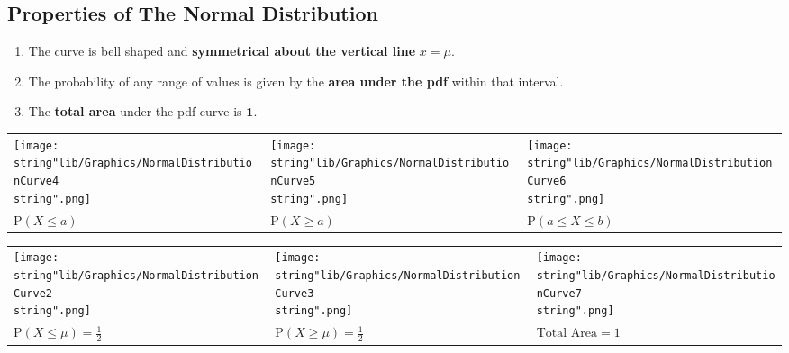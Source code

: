 \documentclass[11pt,a4paper]{book}
\begin{document}
\newpage

\subsection{Properties of The Normal Distribution}

\begin{enumerate}

\item  The curve is bell shaped and \textbf{symmetrical about the
vertical line} $x=\mu$.

\item  The probability of any range of values is given by the \textbf{area
under the pdf} within that interval.

\item  The \textbf{total area} under the pdf curve is $\textbf{1}$.

\end{enumerate}
\begin{center}
\begin{tabular}{>{\centering}p{5cm}>{\centering}p{5cm}>{\centering}p{5cm}}
\centering{}\texttt{[image: \\string"lib/Graphics/NormalDistributionCurve4\\string".png]} & \centering{}\texttt{[image: \\string"lib/Graphics/NormalDistributionCurve5\\string".png]} & \centering{}\texttt{[image: \\string"lib/Graphics/NormalDistributionCurve6\\string".png]}\tabularnewline
$\text{P}\left(X\leq a\right)$ & $\text{P}\left(X\geq a\right)$ & $\text{P}\left(a\leq X\leq b\right)$\tabularnewline
\end{tabular}
\par\end{center}

\begin{center}
\begin{tabular}{>{\centering}p{5cm}>{\centering}p{5cm}>{\centering}p{5cm}}
\centering{}\texttt{[image: \\string"lib/Graphics/NormalDistributionCurve2\\string".png]} & \centering{}\texttt{[image: \\string"lib/Graphics/NormalDistributionCurve3\\string".png]} & \centering{}\texttt{[image: \\string"lib/Graphics/NormalDistributionCurve7\\string".png]}\tabularnewline
${\displaystyle \text{P}\left(X\leq\mu\right)=\frac{1}{2}}$ & ${\displaystyle \text{P}\left(X\geq\mu\right)=\frac{1}{2}}$ & $\text{Total Area}=1$\tabularnewline
\end{tabular}
\par\end{center}
\end{document}
